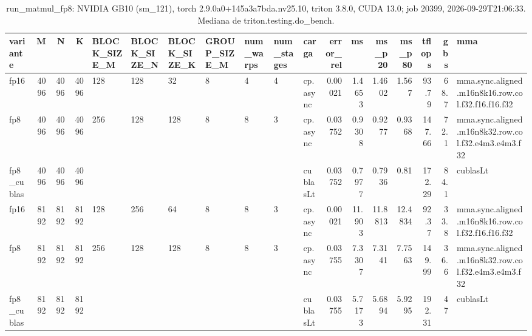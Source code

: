 \begin{table}[htbp]
  \centering\small
  \begin{tabular}{lrrrlllllllrrrrrrl}
    \toprule
    variante & M & N & K & BLOCK\_SIZE\_M & BLOCK\_SIZE\_N & BLOCK\_SIZE\_K & GROUP\_SIZE\_M & num\_warps & num\_stages & carga & error\_rel & ms & ms\_p20 & ms\_p80 & tflops & gbs & mma \\
    \midrule
    fp16 & 4096 & 4096 & 4096 & 128 & 128 & 32 & 8 & 4 & 4 & cp.async & 0.00021 & 1.4653 & 1.4602 & 1.567 & 93.79 & 68.7 & mma.sync.aligned.m16n8k16.row.col.f32.f16.f16.f32 \\
    fp8 & 4096 & 4096 & 4096 & 256 & 128 & 128 & 8 & 8 & 3 & cp.async & 0.03752 & 0.9308 & 0.9277 & 0.9368 & 147.66 & 72.1 & mma.sync.aligned.m16n8k32.row.col.f32.e4m3.e4m3.f32 \\
    fp8\_cublas & 4096 & 4096 & 4096 &  &  &  &  &  &  & cublasLt & 0.03752 & 0.7977 & 0.7936 & 0.81 & 172.29 & 84.1 & cublasLt \\
    fp16 & 8192 & 8192 & 8192 & 128 & 256 & 64 & 8 & 8 & 3 & cp.async & 0.00021 & 11.903 & 11.8813 & 12.4834 & 92.37 & 33.8 & mma.sync.aligned.m16n8k16.row.col.f32.f16.f16.f32 \\
    fp8 & 8192 & 8192 & 8192 & 256 & 128 & 128 & 8 & 8 & 3 & cp.async & 0.03755 & 7.3307 & 7.3141 & 7.7563 & 149.99 & 36.6 & mma.sync.aligned.m16n8k32.row.col.f32.e4m3.e4m3.f32 \\
    fp8\_cublas & 8192 & 8192 & 8192 &  &  &  &  &  &  & cublasLt & 0.03755 & 5.7173 & 5.6894 & 5.9295 & 192.31 & 47 & cublasLt \\
    \bottomrule
  \end{tabular}
  \caption{run\_matmul\_fp8: NVIDIA GB10 (sm\_121), torch 2.9.0a0+145a3a7bda.nv25.10, triton 3.8.0, CUDA 13.0; job 20399, 2026-09-29T21:06:33. Mediana de triton.testing.do\_bench.}
  \label{tab:experimento-fp8}
\end{table}
